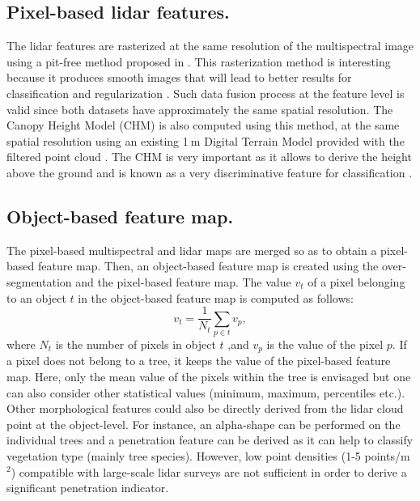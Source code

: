 \subsection{Pixel-based lidar features.}
The lidar features are rasterized at the same resolution of the multispectral image using a pit-free method proposed in \citep{khosravipour2014generating}. This rasterization method is interesting because it produces smooth images that will lead to better results for classification and regularization \citep{Li2013104}. Such data fusion process at the feature level is valid since both datasets have approximately the same spatial resolution. The Canopy Height Model (CHM) is also computed using this method, at the same spatial resolution using an existing 1$\:$m Digital Terrain Model provided with the filtered point cloud \citep{Ferraz201623}. The CHM is very important as it allows to derive the height above the ground and is known as a very discriminative feature for classification \citep{Mallet2011S71,Martin}.

\subsection{Object-based feature map.}
The pixel-based multispectral and lidar maps are merged so as to obtain a pixel-based feature map. Then, an object-based feature map is created using the over-segmentation and the pixel-based feature map. The value $v_{t}$ of a pixel belonging to an object $t$ in the object-based feature map is computed as follows:
\begin{equation}
v_{t}=\frac{1}{N_{t}}\sum_{p \in t} v_{p},
\end{equation}
where $N_{t}$ is the number of pixels in object $t$ ,and $v_{p}$ is the value of the pixel $p$.
If a pixel does not belong to a tree, it keeps the value of the pixel-based feature map. Here, only the mean value of the pixels within the tree is envisaged but one can also consider other statistical values (minimum, maximum, percentiles etc.). \\
Other morphological features could also be directly derived from the lidar cloud point at the object-level. For instance, an alpha-shape can be performed on the individual trees \citep{vauhkonen2010imputation} and a penetration feature can be derived as it can help to classify vegetation type (mainly tree species). However, low point densities (1-5 points/m$^{2}$) compatible with large-scale lidar surveys are not sufficient in order to derive a significant penetration indicator.

